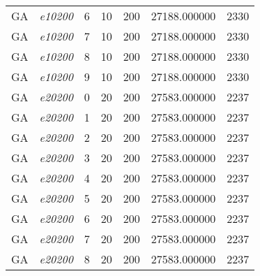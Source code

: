 {\begin{longtable}{cc|c|cc|cc}
			GA                 & \textit{e10200}    & 6                               & 10               & 200              & 27188.000000                          & 2330 \\ 
			GA                 & \textit{e10200}    & 7                               & 10               & 200              & 27188.000000                          & 2330 \\ 
			GA                 & \textit{e10200}    & 8                               & 10               & 200              & 27188.000000                          & 2330 \\ 
			GA                 & \textit{e10200}    & 9                               & 10               & 200              & 27188.000000                          & 2330 \\ \hline
			GA                 & \textit{e20200}    & 0                               & 20               & 200              & 27583.000000                          & 2237 \\ 
			GA                 & \textit{e20200}    & 1                               & 20               & 200              & 27583.000000                          & 2237 \\ 
			GA                 & \textit{e20200}    & 2                               & 20               & 200              & 27583.000000                          & 2237 \\ 
			GA                 & \textit{e20200}    & 3                               & 20               & 200              & 27583.000000                          & 2237 \\ 
			GA                 & \textit{e20200}    & 4                               & 20               & 200              & 27583.000000                          & 2237 \\ 
			GA                 & \textit{e20200}    & 5                               & 20               & 200              & 27583.000000                          & 2237 \\ 
			GA                 & \textit{e20200}    & 6                               & 20               & 200              & 27583.000000                          & 2237 \\ 
			GA                 & \textit{e20200}    & 7                               & 20               & 200              & 27583.000000                          & 2237 \\ 
			GA                 & \textit{e20200}    & 8                               & 20               & 200              & 27583.000000                          & 2237 \\ 

\end{longtable}}
